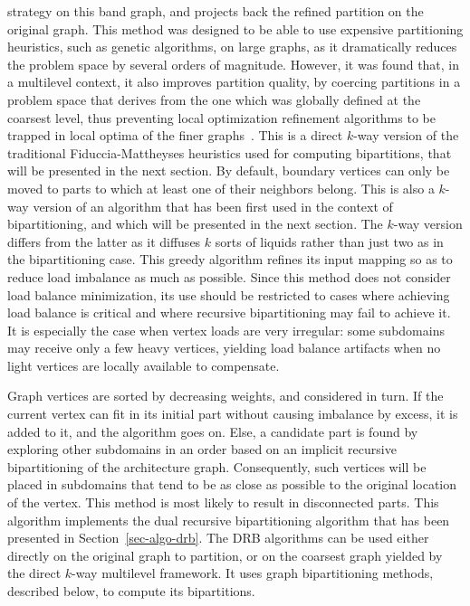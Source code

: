 \begin{itemize}
strategy on this band graph, and projects back the refined partition
on the original graph. This method was designed to be able to use
expensive partitioning heuristics, such as genetic algorithms, on
large graphs, as it dramatically reduces the problem space by several
orders of magnitude. However, it was found that, in a multilevel
context, it also improves partition quality, by coercing partitions in
a problem space that derives from the one which was globally defined
at the coarsest level, thus preventing local optimization refinement
algorithms to be trapped in local optima of the finer
graphs~\cite{chpe06a}.
This is a direct $k$-way version of the traditional Fiduccia-Mattheyses
heuristics used for computing bipartitions, that will be presented in
the next section. By default, boundary vertices can only be moved to
parts to which at least one of their neighbors belong.
This is also a $k$-way version of an algorithm that has been first used
in the context of bipartitioning, and which will be presented in the
next section. The $k$-way version differs from the latter as it diffuses
$k$ sorts of liquids rather than just two as in the bipartitioning case.
\label{sec-algo-map-exact}
This greedy algorithm refines its input mapping so as to reduce load
imbalance as much as possible. Since this method does not consider
load balance minimization, its use should be restricted to cases where 
achieving load balance is critical and where recursive
bipartitioning may fail to achieve it. It is especially the case when
vertex loads are very irregular: some subdomains may receive only a
few heavy vertices, yielding load balance artifacts when no light
vertices are locally available to compensate.

Graph vertices are sorted by decreasing weights, and considered in
turn. If the current vertex can fit in its initial part without
causing imbalance by excess, it is added to it, and the algorithm goes
on. Else, a candidate part is found by exploring other subdomains in
an order based on an implicit recursive bipartitioning of the
architecture graph. Consequently, such vertices will be placed in
subdomains that tend to be as close as possible to the original
location of the vertex. This method is most likely to result in
disconnected parts.
This algorithm implements the dual recursive bipartitioning algorithm
that has been presented in Section~\ref{sec-algo-drb}. The DRB
algorithms can be used either directly on the original graph to
partition, or on the coarsest graph yielded by the direct $k$-way
multilevel framework. It uses graph bipartitioning methods, described
below, to compute its bipartitions.
\end{itemize}

